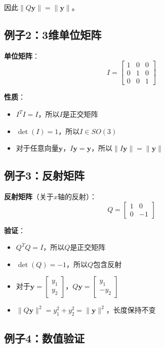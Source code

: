 \documentclass[12pt,a4paper]{article}
\begin{document}
因此$\|Q\bm{y}\| = \|\bm{y}\|$。

\subsection{例子2：3维单位矩阵}

\textbf{单位矩阵}：
\begin{equation}
I = \begin{bmatrix} 1 & 0 & 0 \\ 0 & 1 & 0 \\ 0 & 0 & 1 \end{bmatrix}
\end{equation}

\textbf{性质}：
\begin{itemize}
\item $I^T I = I$，所以$I$是正交矩阵
\item $\det(I) = 1$，所以$I \in SO(3)$
\item 对于任意向量$\bm{y}$，$I\bm{y} = \bm{y}$，所以$\|I\bm{y}\| = \|\bm{y}\|$
\end{itemize}

\subsection{例子3：反射矩阵}

\textbf{反射矩阵}（关于$x$轴的反射）：
\begin{equation}
Q = \begin{bmatrix} 1 & 0 \\ 0 & -1 \end{bmatrix}
\end{equation}

\textbf{验证}：
\begin{itemize}
\item $Q^T Q = I$，所以$Q$是正交矩阵
\item $\det(Q) = -1$，所以$Q$包含反射
\item 对于$\bm{y} = \begin{bmatrix} y_1 \\ y_2 \end{bmatrix}$，$Q\bm{y} = \begin{bmatrix} y_1 \\ -y_2 \end{bmatrix}$
\item $\|Q\bm{y}\|^2 = y_1^2 + y_2^2 = \|\bm{y}\|^2$，长度保持不变
\end{itemize}

\subsection{例子4：数值验证}
\end{document}
